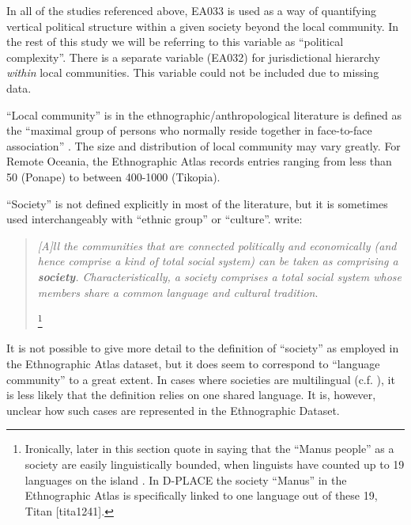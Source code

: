 \documentclass[a4paper,10pt]{article} %
\begin{document}
In all of the studies referenced above, EA033 is used as a way of quantifying vertical political structure within a given society beyond the local community. In the rest of this study we will be referring to this variable as ``political complexity''. There is a separate variable (EA032) for jurisdictional hierarchy \emph{within} local communities. This variable could not be included due to missing data. 

``Local community'' is in the ethnographic/anthropological literature is defined as the ``maximal group of persons who normally reside together in face-to-face association'' \citep{yale1945outline}. The size and distribution of local community may vary greatly. For Remote Oceania, the Ethnographic Atlas records entries ranging from less than 50 (Ponape) to between 400-1000 (Tikopia).

``Society'' is not defined explicitly in most of the literature, but it is sometimes used interchangeably with ``ethnic group'' or ``culture''. \citet{roger1981cultural} write:

\begin{quotation}
\noindent\emph{[A]ll the communities that are connected politically and economically (and hence comprise a kind of total social system) can be taken as comprising a \textbf{society}. Characteristically, a society comprises a total social system whose members share a common language and cultural tradition}. 
\begin{flushright}
\citep[22]{roger1981cultural} \footnote{Ironically, later in this section \citet[23]{roger1981cultural} quote \citet[422]{schwartz1978culture} in saying that the ``Manus people'' as a society are easily linguistically bounded, when linguists have counted up to 19 languages on the island \citep{glottolog40}. In D-PLACE \citep{d_place_all} the society ``Manus'' in the Ethnographic Atlas is specifically linked to one language out of these 19, Titan [tita1241].} 

\end{flushright}
 \end{quotation}

It is not possible to give more detail to the definition of ``society'' as employed in the Ethnographic Atlas dataset, but it does seem to correspond to ``language community'' to a great extent. In cases where societies are multilingual (c.f. \citet{evans2017did}), it is less likely that the definition relies on one shared language. It is, however, unclear how such cases are represented in the Ethnographic Dataset.
\end{document}

